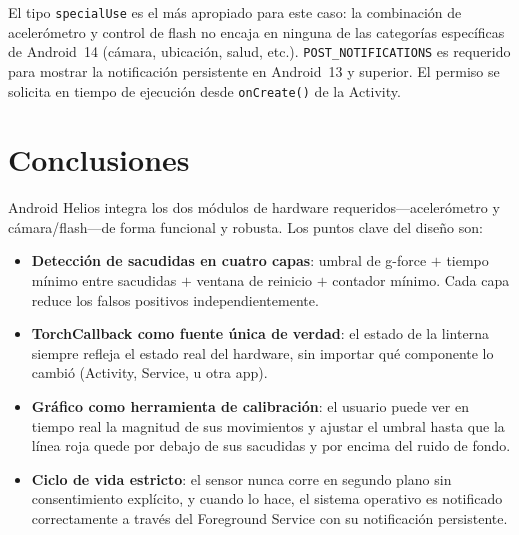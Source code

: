 \documentclass[12pt, a4paper]{article}
\begin{document}
El tipo \texttt{specialUse} es el m\'as apropiado para este caso: la
combinaci\'on de aceler\'ometro y control de flash no encaja en ninguna de las
categor\'ias espec\'ificas de Android~14 (c\'amara, ubicaci\'on, salud, etc.).
\texttt{POST\_NOTIFICATIONS} es requerido para mostrar la notificaci\'on
persistente en Android~13 y superior. El permiso se solicita en tiempo de
ejecuci\'on desde \texttt{onCreate()} de la Activity.

\section{Conclusiones}

Android Helios integra los dos m\'odulos de hardware requeridos---aceler\'ometro
y c\'amara/flash---de forma funcional y robusta. Los puntos clave del dise\~no son:

\begin{itemize}
  \item \textbf{Detecci\'on de sacudidas en cuatro capas}: umbral de g-force
        $+$ tiempo m\'inimo entre sacudidas $+$ ventana de reinicio $+$
        contador m\'inimo. Cada capa reduce los falsos positivos
        independientemente.

  \item \textbf{TorchCallback como fuente \'unica de verdad}: el estado de la
        linterna siempre refleja el estado real del hardware, sin importar
        qu\'e componente lo cambi\'o (Activity, Service, u otra app).

  \item \textbf{Gr\'afico como herramienta de calibraci\'on}: el usuario puede
        ver en tiempo real la magnitud de sus movimientos y ajustar el umbral
        hasta que la l\'inea roja quede por debajo de sus sacudidas y por
        encima del ruido de fondo.

  \item \textbf{Ciclo de vida estricto}: el sensor nunca corre en segundo
        plano sin consentimiento expl\'icito, y cuando lo hace, el sistema
        operativo es notificado correctamente a trav\'es del Foreground
        Service con su notificaci\'on persistente.
\end{itemize}
\end{document}
